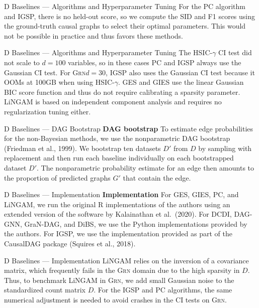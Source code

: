 \documentclass[aspectratio=169,10pt]{beamer}
\newcommand{\domain}[1]{\textsc{#1}}
\newcommand{\grndomain}{\domain{Grn}\xspace}
\begin{document}
\begin{frame}{D Baselines --- Algorithms and Hyperparameter Tuning}
For the PC algorithm and IGSP, there is no held-out score, so we compute the SID and F1 scores using the ground-truth causal graphs to select their optimal parameters. This would not be possible in practice and thus favors these methods.
\end{frame}

\begin{frame}{D Baselines --- Algorithms and Hyperparameter Tuning}
\small
The HSIC-$\gamma$ CI test did not scale to $d=100$ variables, so in these cases PC and IGSP always use the Gaussian CI test. For \grndomain $d=30$, IGSP also uses the Gaussian CI test because it OOMs at 100GB when using HSIC-$\gamma$. GES and GIES use the linear Gaussian BIC score function and thus do not require calibrating a sparsity parameter. LiNGAM is based on independent component analysis and requires no regularization tuning either.
\end{frame}

\begin{frame}{D Baselines --- DAG Bootstrap}
\textbf{DAG bootstrap}\quad
To estimate edge probabilities for the non-Bayesian methods, we use the nonparametric DAG bootstrap (Friedman et al., 1999). We bootstrap ten datasets $D'$ from $D$ by sampling with replacement and then run each baseline individually on each bootstrapped dataset $D'$. The nonparametric probability estimate for an edge then amounts to the proportion of predicted graphs $G'$ that contain the edge.
\end{frame}

\begin{frame}{D Baselines --- Implementation}
\textbf{Implementation}\quad
For GES, GIES, PC, and LiNGAM, we run the original R implementations of the authors using an extended version of the software by Kalainathan et al.\ (2020). For DCDI, DAG-GNN, GraN-DAG, and DiBS, we use the Python implementations provided by the authors. For IGSP, we use the implementation provided as part of the CausalDAG package (Squires et al., 2018).
\end{frame}

\begin{frame}{D Baselines --- Implementation}
\small
LiNGAM relies on the inversion of a covariance matrix, which frequently fails in the \grndomain domain due to the high sparsity in $D$. Thus, to benchmark LiNGAM in \grndomain, we add small Gaussian noise to the standardized count matrix $D$. For the IGSP and PC algorithms, the same numerical adjustment is needed to avoid crashes in the CI tests on \grndomain.
\end{frame}
\end{document}
